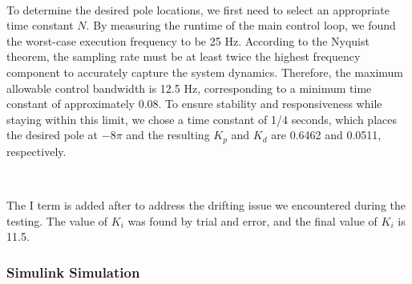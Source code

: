 \documentclass{article}
\begin{document}
\

To determine the desired pole locations, we first need to select an appropriate
time constant $N$. By measuring the runtime of the main control loop, we found
the worst-case execution frequency to be 25 Hz. According to the Nyquist
theorem, the sampling rate must be at least twice the highest frequency
component to accurately capture the system dynamics. Therefore, the maximum
allowable control bandwidth is 12.5 Hz, corresponding to a minimum time constant
of approximately 0.08. To ensure stability and responsiveness while staying
within this limit, we chose a time constant of 1/4 seconds, which places the
desired pole at $-8\pi$ and the resulting $K_p$ and $K_d$ are 0.6462 and 0.0511,
respectively.

\

The I term is added after to address the drifting issue we encountered during
the testing. The value of $K_i$ was found by trial and error, and the final
value of $K_i$ is 11.5.

\subsubsection{Simulink Simulation}
\end{document}
